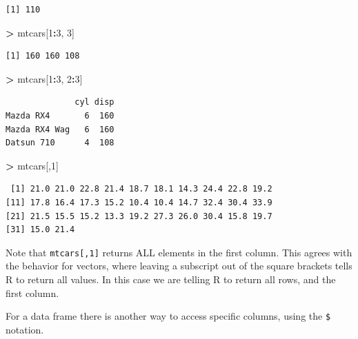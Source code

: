 \documentclass[]{krantz}
\makeatletter
\newenvironment{Shaded}{\begin{snugshade}}{\end{snugshade}}
\newcommand{\DecValTok}[1]{\textcolor[rgb]{0.06,0.06,0.06}{#1}}
\newcommand{\StringTok}[1]{\textcolor[rgb]{0.5,0.5,0.5}{#1}}
\newcommand{\OperatorTok}[1]{\textcolor[rgb]{0.43,0.43,0.43}{\textbf{#1}}}
\newcommand{\NormalTok}[1]{#1}
\newenvironment{kframe}{%
\medskip{}
\setlength{\fboxsep}{.8em}
 \def\at@end@of@kframe{}%
 \ifinner\ifhmode%
  \def\at@end@of@kframe{\end{minipage}}%
  \begin{minipage}{\columnwidth}%
 \fi\fi%
 \def\FrameCommand##1{\hskip\@totalleftmargin \hskip-\fboxsep
 \colorbox{shadecolor}{##1}\hskip-\fboxsep
     \hskip-\linewidth \hskip-\@totalleftmargin \hskip\columnwidth}%
 \MakeFramed {\advance\hsize-\width
   \@totalleftmargin\z@ \linewidth\hsize
   \@setminipage}}%
 {\par\unskip\endMakeFramed%
 \at@end@of@kframe}
\renewenvironment{Shaded}{\begin{kframe}}{\end{kframe}}
\makeatother
\begin{document}
\begin{verbatim}
[1] 110
\end{verbatim}

\begin{Shaded}
\begin{Highlighting}[]
\OperatorTok{>}\StringTok{ }\NormalTok{mtcars[}\DecValTok{1}\OperatorTok{:}\DecValTok{3}\NormalTok{, }\DecValTok{3}\NormalTok{]}
\end{Highlighting}
\end{Shaded}

\begin{verbatim}
[1] 160 160 108
\end{verbatim}

\begin{Shaded}
\begin{Highlighting}[]
\OperatorTok{>}\StringTok{ }\NormalTok{mtcars[}\DecValTok{1}\OperatorTok{:}\DecValTok{3}\NormalTok{, }\DecValTok{2}\OperatorTok{:}\DecValTok{3}\NormalTok{]}
\end{Highlighting}
\end{Shaded}

\begin{verbatim}
              cyl disp
Mazda RX4       6  160
Mazda RX4 Wag   6  160
Datsun 710      4  108
\end{verbatim}

\begin{Shaded}
\begin{Highlighting}[]
\OperatorTok{>}\StringTok{ }\NormalTok{mtcars[,}\DecValTok{1}\NormalTok{]}
\end{Highlighting}
\end{Shaded}

\begin{verbatim}
 [1] 21.0 21.0 22.8 21.4 18.7 18.1 14.3 24.4 22.8 19.2
[11] 17.8 16.4 17.3 15.2 10.4 10.4 14.7 32.4 30.4 33.9
[21] 21.5 15.5 15.2 13.3 19.2 27.3 26.0 30.4 15.8 19.7
[31] 15.0 21.4
\end{verbatim}

Note that \texttt{mtcars{[},1{]}} returns ALL elements in the first
column. This agrees with the behavior for vectors, where leaving a
subscript out of the square brackets tells R to return all values. In
this case we are telling R to return all rows, and the first column.

For a data frame there is another way to access specific columns, using
the \texttt{\$} notation.

\begin{Shaded}
\end{Shaded}
\end{document}

